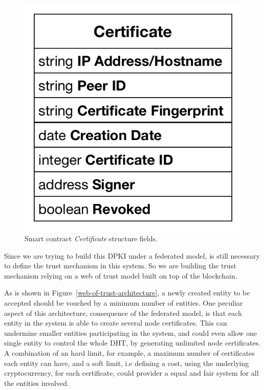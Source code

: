 \begin{figure}
  \includegraphics[width=\linewidth]{Figures/certificate-structure.pdf}
  \caption{Smart contract \textit{Certificate} structure fields.}
  \label{fig:certificate-structure}
\end{figure}

Since we are trying to build this \ac{DPKI} under a federated model, is still necessary to define the trust mechanism in this system.
So we are building the trust mechanism relying on a web of trust model built on top of the blockchain.

As is shown in Figure~\ref{web-of-trust-architecture}, a newly created entity to be accepted should be vouched by a minimum number of entities.
One peculiar aspect of this architecture, consequence of the federated model, is that each entity in the system is able to create several node certificates.
This can undermine smaller entities participating in the system, and could even allow one single entity to control the whole \ac{DHT}, by generating unlimited node certificates.
A combination of an hard limit, for example, a maximum number of certificates each entity can have, and a soft limit, i.e defining a cost, using the underlying cryptocurrency, for each certificate, could provider a equal and fair system for all the entities involved.

